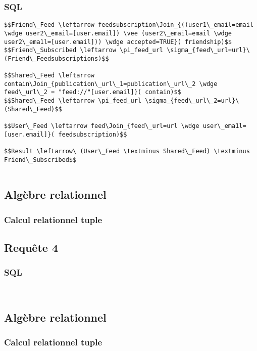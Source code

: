 \documentclass[a4paper,10pt]{article}
\begin{document}
\subsubsection{SQL}
\begin{verbatim}
$$Friend\_Feed \leftarrow feedsubscription\Join_{((user1\_email=email \wdge user2\_email=[user.email]) \vee (user2\_email=email \wdge user2\_ema1l=[user.email])) \wdge accepted=TRUE}( friendship)$$
$$Friend\_Subscribed \leftarrow \pi_feed_url \sigma_{feed\_url=url}\ (Friend\_Feedsubscriptions)$$

$$Shared\_Feed \leftarrow contain\Join_{publication\_url\_1=publication\_url\_2 \wdge feed\_url\_2 = "feed://"[user.email]}( contain)$$
$$Shared\_Feed \leftarrow \pi_feed_url \sigma_{feed\_url\_2=url}\ (Shared\_Feed)$$

$$User\_Feed \leftarrow feed\Join_{feed\_url=url \wdge user\_ema1l=[user.email]}( feedsubscription)$$

$$Result \leftarrow\ (User\_Feed \textminus Shared\_Feed) \textminus Friend\_Subscribed$$


\end{verbatim}
\subsection{Algèbre relationnel}

\subsubsection{Calcul relationnel tuple}

\subsection{Requête 4}
\subsubsection{SQL}
\begin{verbatim}


\end{verbatim}
\subsection{Algèbre relationnel}

\subsubsection{Calcul relationnel tuple}
\end{document}
